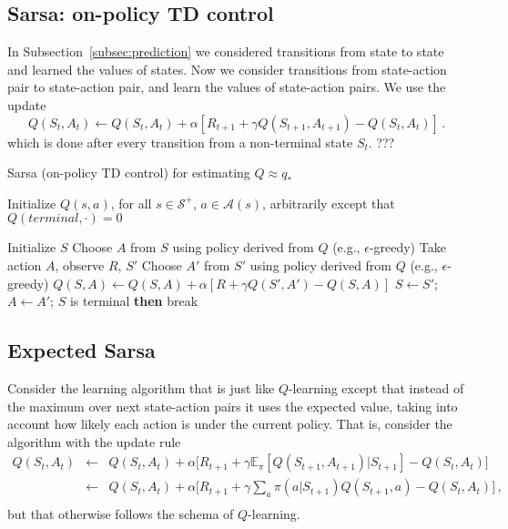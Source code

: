 \documentclass[12pt]{article}
\newcommand{\<}{\langle}
\renewcommand{\>}{\rangle}
\renewcommand{\S}{\mathcal{S}}
\newcommand{\A}{\mathcal{A}}
\newcommand{\E}{\mathbb{E}}
\begin{document}
%
%
%

\subsection{Sarsa: on-policy TD control}

In Subsection~\ref{subsec:prediction} we considered transitions from state to state and learned the values of states. Now we consider transitions from state-action pair to state-action pair, and learn the values of
state-action pairs. We use the update
\begin{equation}
Q(S_t,A_t)\leftarrow Q(S_t,A_t) + \alpha [R_{t+1} + \gamma Q(S_{t+1}, A_{t+1}) - Q(S_t, A_t)]\,.
\end{equation}
which is done after every transition from a non-terminal state $S_t$. ???


\begin{algorithm}
\caption{Sarsa (on-policy TD control) for estimating $Q\approx q_*$}
\begin{algorithmic}
\State Initialize $Q(s,a)$, for all $s\in\S^+$, $a\in\A(s)$, arbitrarily except that $Q(terminal,\cdot)=0$

\medskip
{}
  \State Initialize $S$
  \State Choose $A$ from $S$ using policy derived from $Q$ (e.g., $\epsilon$-greedy)
    \State Take action $A$, observe $R$, $S'$
    \State Choose $A'$ from $S'$ using policy derived from $Q$ (e.g., $\epsilon$-greedy)
    \State $Q(S,A)\leftarrow Q(S,A) + \alpha [R + \gamma Q(S',A') - Q(S,A)]$
    \State $S\leftarrow S'$; $A\leftarrow A'$;
     $S$ is terminal {\bf then} break
  \EndFor
\EndFor
\end{algorithmic}
\end{algorithm}

%
%
%

\subsection{Expected Sarsa}

Consider the learning algorithm that is just like $Q$-learning except that instead of the maximum over next state-action pairs it uses the expected value, taking into account how likely each action is under the current policy. That is, consider the algorithm with the update rule
\begin{eqnarray*}
Q(S_t,A_t) 
& \leftarrow & 
Q(S_t,A_t) + \alpha \Big[ R_{t+1} + \gamma \E_\pi[Q(S_{t+1},A_{t+1}) | S_{t+1}] - Q(S_t,A_t) \Big] \\
& \leftarrow &
Q(S_t,A_t) + \alpha \Big[ R_{t+1} + \gamma \sum_a \pi(a|S_{t+1}) Q(S_{t+1},a) - Q(S_t,A_t) \Big]\,, \\
\end{eqnarray*}
but that otherwise follows the schema of $Q$-learning. 
\end{document}
